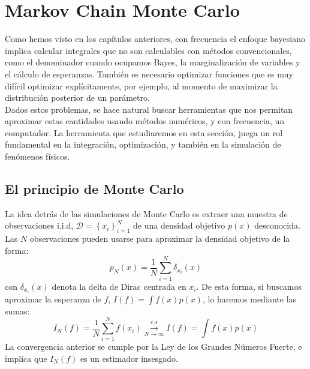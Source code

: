 \chapter{Markov Chain Monte Carlo}

Como hemos visto en los capítulos anteriores, con frecuencia el enfoque bayesiano implica calcular integrales que no son calculables con métodos convencionales, como el denominador cuando ocupamos Bayes, la marginalización de variables y el cálculo de esperanzas. También es necesario optimizar funciones que es muy difícil optimizar explícitamente, por ejemplo, al momento de maximizar la distribución posterior de un parámetro.  \\
Dados estos problemas, se hace natural buscar herramientas que nos permitan aproximar estas cantidades usando métodos numéricos, y con frecuencia, un computador. La herramienta que estudiaremos en esta sección, juega un rol fundamental en la integración, optimización, y también en la simulación de fenómenos físicos. 

\section{El principio de Monte Carlo}

La idea detrás de las simulaciones de Monte Carlo es extraer una muestra de observaciones i.i.d, $\mathcal{D}=\left \{ x_i \right \}_{i=1}^{N}$ de una densidad objetivo $p(x)$ desconocida. Las $N$ observaciones pueden usarse para aproximar la densidad objetivo de la forma: 
$$
p_{N}(x)=\dfrac{1}{N} \sum_{i=1}^{N} \delta_{x_i}(x)
$$
con $\delta_{x_i}(x)$ denota la delta de Dirac centrada en $x_i$. De esta forma, si buscamos aproximar la esperanza de $f$, $I(f)=\int f(x)p(x)$, lo haremos mediante las sumas: 
$$
I_{N}(f)= \dfrac{1}{N} \sum_{i=1}^{N}f(x_i) \overset{c.s}{ \underset{N \to \infty}{\rightarrow }} I(f)= \int f(x)p(x) 
$$
La convergencia anterior se cumple por la Ley de los Grandes Números Fuerte, e implica que $I_{N}(f)$ es un estimador insesgado. 






